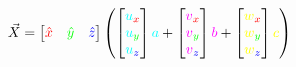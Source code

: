 \documentclass[preview]{standalone}
\begin{document}
$$\vec{X} = \begin{bmatrix}\textcolor[HTML]{FF0000}{\hat{x}}&\textcolor[HTML]{00FF00}{\hat{y}}&\textcolor[HTML]{0000FF}{\hat{z}}\end{bmatrix}\left(
\begin{bmatrix}\textcolor[HTML]{00FFFF}{u}_{\textcolor[HTML]{FF0000}{x}}\\\textcolor[HTML]{00FFFF}{u}_{\textcolor[HTML]{00FF00}{y}}\\\textcolor[HTML]{00FFFF}{u}_{\textcolor[HTML]{0000FF}{z}}\end{bmatrix}\textcolor[HTML]{00FFFF}{a} +
\begin{bmatrix}\textcolor[HTML]{FF00FF}{v}_{\textcolor[HTML]{FF0000}{x}}\\\textcolor[HTML]{FF00FF}{v}_{\textcolor[HTML]{00FF00}{y}}\\\textcolor[HTML]{FF00FF}{v}_{\textcolor[HTML]{0000FF}{z}}\end{bmatrix}\textcolor[HTML]{FF00FF}{b} +
\begin{bmatrix}\textcolor[HTML]{FFFF00}{w}_{\textcolor[HTML]{FF0000}{x}}\\\textcolor[HTML]{FFFF00}{w}_{\textcolor[HTML]{00FF00}{y}}\\\textcolor[HTML]{FFFF00}{w}_{\textcolor[HTML]{0000FF}{z}}\end{bmatrix}\textcolor[HTML]{FFFF00}{c}
\right)$$
\end{document}
